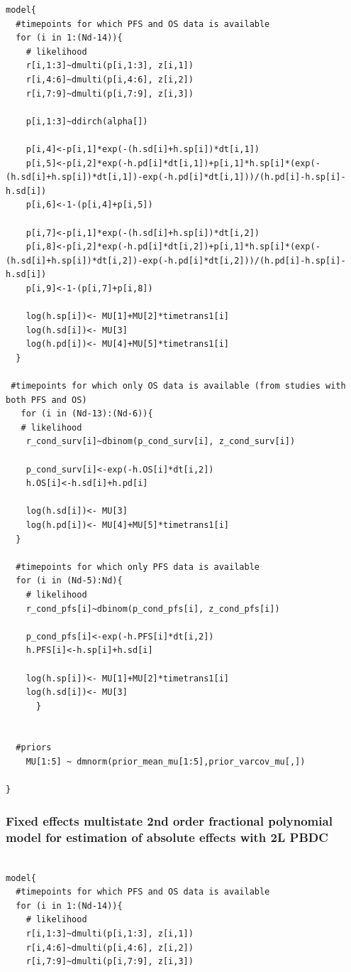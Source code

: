 \documentclass[11pt,final,fleqn]{article}\usepackage[]{graphicx}\usepackage[]{color}
\theoremstyle{plain}
\begin{document}
\begin{appendices}
\begin{verbatim}
model{
  #timepoints for which PFS and OS data is available
  for (i in 1:(Nd-14)){
    # likelihood
    r[i,1:3]~dmulti(p[i,1:3], z[i,1]) 
    r[i,4:6]~dmulti(p[i,4:6], z[i,2]) 
    r[i,7:9]~dmulti(p[i,7:9], z[i,3]) 
    
    p[i,1:3]~ddirch(alpha[])
    
    p[i,4]<-p[i,1]*exp(-(h.sd[i]+h.sp[i])*dt[i,1])
    p[i,5]<-p[i,2]*exp(-h.pd[i]*dt[i,1])+p[i,1]*h.sp[i]*(exp(-(h.sd[i]+h.sp[i])*dt[i,1])-exp(-h.pd[i]*dt[i,1]))/(h.pd[i]-h.sp[i]-h.sd[i])
    p[i,6]<-1-(p[i,4]+p[i,5])
    
    p[i,7]<-p[i,1]*exp(-(h.sd[i]+h.sp[i])*dt[i,2])
    p[i,8]<-p[i,2]*exp(-h.pd[i]*dt[i,2])+p[i,1]*h.sp[i]*(exp(-(h.sd[i]+h.sp[i])*dt[i,2])-exp(-h.pd[i]*dt[i,2]))/(h.pd[i]-h.sp[i]-h.sd[i])
    p[i,9]<-1-(p[i,7]+p[i,8])
    
    log(h.sp[i])<- MU[1]+MU[2]*timetrans1[i] 
    log(h.sd[i])<- MU[3]
    log(h.pd[i])<- MU[4]+MU[5]*timetrans1[i]
  }
  
 #timepoints for which only OS data is available (from studies with both PFS and OS)
   for (i in (Nd-13):(Nd-6)){
   # likelihood
    r_cond_surv[i]~dbinom(p_cond_surv[i], z_cond_surv[i]) 
    
    p_cond_surv[i]<-exp(-h.OS[i]*dt[i,2])
    h.OS[i]<-h.sd[i]+h.pd[i]
    
    log(h.sd[i])<- MU[3] 
    log(h.pd[i])<- MU[4]+MU[5]*timetrans1[i]
  }
    
  #timepoints for which only PFS data is available 
  for (i in (Nd-5):Nd){
    # likelihood
    r_cond_pfs[i]~dbinom(p_cond_pfs[i], z_cond_pfs[i]) 
    
    p_cond_pfs[i]<-exp(-h.PFS[i]*dt[i,2])
    h.PFS[i]<-h.sp[i]+h.sd[i]
    
    log(h.sp[i])<- MU[1]+MU[2]*timetrans1[i]
    log(h.sd[i])<- MU[3] 
      }
  
  
  #priors
    MU[1:5] ~ dmnorm(prior_mean_mu[1:5],prior_varcov_mu[,]) 

}

\end{verbatim}

\subsubsection{Fixed effects multistate 2nd order fractional polynomial  model for estimation of absolute effects with 2L PBDC} 
\begin{verbatim} 

model{
  #timepoints for which PFS and OS data is available
  for (i in 1:(Nd-14)){
    # likelihood
    r[i,1:3]~dmulti(p[i,1:3], z[i,1]) 
    r[i,4:6]~dmulti(p[i,4:6], z[i,2]) 
    r[i,7:9]~dmulti(p[i,7:9], z[i,3]) 
    

\end{verbatim}
\end{appendices}
\end{document}
